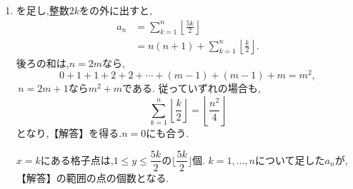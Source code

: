     \noindent {}\par\nobreak
    \begin{enumerate}[label=(\arabic*),parsep=3pt,beginpenalty=10000,format=\bookitemlink{example-gauss-role-10}{solution}{problem}]
      \item {}を足し,整数$2k$をの外に出すと,
            \begin{align*}
              a_n&=\sum_{k=1}^{n}\left\lfloor\frac{5k}{2}\right\rfloor\\
                 &=n(n+1)+\sum_{k=1}^{n}\left\lfloor\frac k2\right\rfloor.
            \end{align*}
            後ろの和は,$n=2m$なら,
            \[
              0+1+1+2+2+\cdots+(m-1)+(m-1)+m=m^2,
            \]
            \,$n=2m+1$なら$m^2+m$である.
            従っていずれの場合も,
            \[
              \sum_{k=1}^{n}\left\lfloor\frac k2\right\rfloor
              =\left\lfloor\frac{n^2}{4}\right\rfloor
            \]
            となり,【解答】を得る.$n=0$にも合う.

            $x=k$にある格子点は,$1\le y\le\dfrac{5k}{2}$の$\lfloor\dfrac{5k}{2}\rfloor$個.
            $k=1,\ldots,n$について足した$a_n$が,【解答】の範囲の点の個数となる.
    \end{enumerate}
